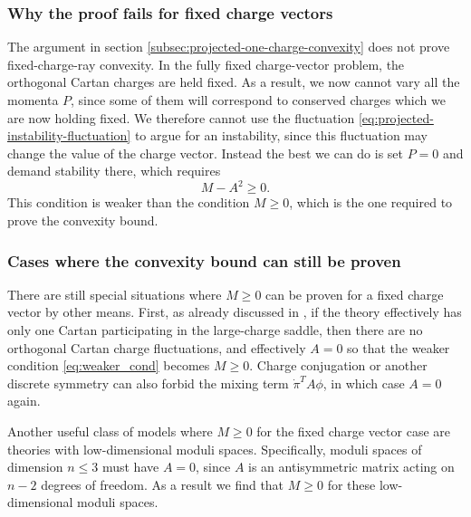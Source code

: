 \documentclass[a4paper,11pt]{article}
\begin{document}
\subsubsection{Why the proof fails for fixed charge vectors}\label{subsubsec:fixed-ray-variational-failure}

The argument in section \ref{subsec:projected-one-charge-convexity} does not prove fixed-charge-ray convexity. In the fully fixed charge-vector problem, the orthogonal Cartan charges are held fixed. As a result, we now cannot vary all the momenta $P$, since some of them will correspond to conserved charges which we are now holding fixed. We therefore cannot use the fluctuation \eqref{eq:projected-instability-fluctuation} to argue for an instability, since this fluctuation may change the value of the charge vector. Instead the best we can do is set $P=0$ and demand stability there, which requires
\begin{equation}\label{eq:weaker_cond}
  M-A^2\geq 0.
\end{equation}
This condition is weaker than the condition $M\geq 0$, which is the one required to prove the convexity bound. 

\subsubsection{Cases where the convexity bound can still be proven}

There are still special situations where $M\geq0$ can be proven for a fixed charge vector by other
means. First, as already discussed in \cite{Cuomo:2024fuy}, if the theory effectively has only one Cartan participating in the large-charge saddle, then there are no orthogonal Cartan charge fluctuations, and effectively $A=0$ so that the weaker condition \eqref{eq:weaker_cond} becomes $M\geq 0$. Charge conjugation or another discrete symmetry can also forbid the mixing term $\dot\pi^TA\phi$, in which case $A=0$ again.

Another useful class of models where $M\geq 0$ for the fixed charge vector case are theories with low-dimensional moduli spaces. Specifically, moduli spaces of dimension $n\leq 3$ must have $A=0$, since $A$ is an antisymmetric matrix acting on $n-2$ degrees of freedom. As a result we find that $M\geq 0$ for these low-dimensional moduli spaces. 
\end{document}
